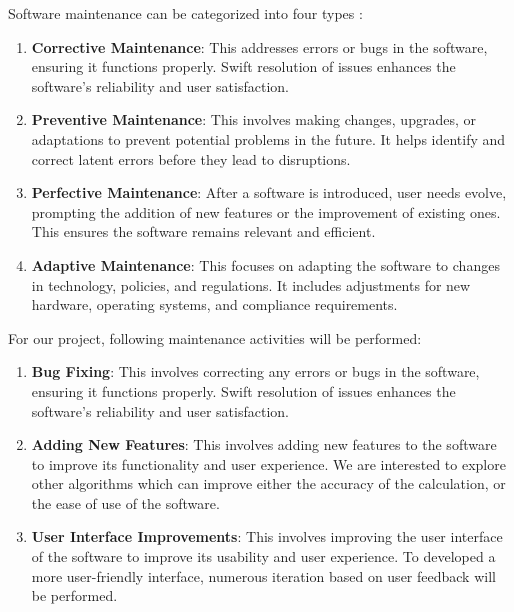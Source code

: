 Software maintenance can be categorized into four types \cite{Bhatt04}\cite{geeksforgeeks_2023b}:

\begin{enumerate}
    \item \textbf{Corrective Maintenance}: This addresses errors or bugs in the software, ensuring it functions properly. Swift resolution of issues enhances the software's reliability and user satisfaction.
    \item \textbf{Preventive Maintenance}: This involves making changes, upgrades, or adaptations to prevent potential problems in the future. It helps identify and correct latent errors before they lead to disruptions.
    \item \textbf{Perfective Maintenance}: After a software is introduced, user needs evolve, prompting the addition of new features or the improvement of existing ones. This ensures the software remains relevant and efficient.
    \item \textbf{Adaptive Maintenance}: This focuses on adapting the software to changes in technology, policies, and regulations. It includes adjustments for new hardware, operating systems, and compliance requirements.
\end{enumerate}

For our project, following maintenance activities will be performed:

\begin{enumerate}
    \item \textbf{Bug Fixing}: This involves correcting any errors or bugs in the software, ensuring it functions properly. Swift resolution of issues enhances the software's reliability and user satisfaction.
    \item \textbf{Adding New Features}: This involves adding new features to the software to improve its functionality and user experience. We are interested to explore other algorithms which can improve either the accuracy of the calculation, or the ease of use of the software.
    \item \textbf{User Interface Improvements}: This involves improving the user interface of the software to improve its usability and user experience. To developed a more user-friendly interface, numerous iteration based on user feedback will be performed.
\end{enumerate}
